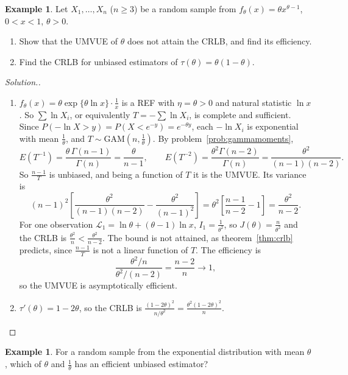 \documentclass[12pt,a4paper]{report}
\theoremstyle{definition}
\newtheorem{exa}[thm]{Example}
\newenvironment{solution}
  {\renewcommand{\qedsymbol}{}\begin{proof}[\textit{Solution}.]}
  {\end{proof}}
\begin{document}
\begin{exa}
\label{ex:powercrlb}
Let $X_1, \dots, X_n$ ($n\ge 3$) be a random sample from $f_\theta(x) = \theta x^{\theta - 1}$,
$0<x<1$, $\theta>0$.
\begin{enumerate}
\item[(a)] Show that the UMVUE of $\theta$ does not attain the CRLB, and find its
efficiency.
\item[(b)] Find the CRLB for unbiased estimators of $\tau(\theta) = \theta(1 - \theta)$.
\end{enumerate}
\end{exa}

\begin{solution}
\begin{enumerate}
\item[(a)] $f_\theta(x) = \theta\exp\{\theta\ln x\}\cdot\frac1x$ is a REF with
$\eta = \theta>0$ and natural statistic $\ln x$. So $\sum\ln X_i$, or equivalently
$T = -\sum\ln X_i$, is complete and sufficient. Since
$P(-\ln X>y) = P(X<e^{-y}) = e^{-\theta y}$, each $-\ln X_i$ is exponential with mean
$\frac1\theta$, and $T\sim\text{GAM}\left(n, \frac1\theta\right)$. By
problem~\ref{prob:gammamoments},
\[E(T^{-1}) = \frac{\theta\,\Gamma(n - 1)}{\Gamma(n)} = \frac{\theta}{n - 1},\qquad
E(T^{-2}) = \frac{\theta^2\Gamma(n - 2)}{\Gamma(n)} = \frac{\theta^2}{(n - 1)(n - 2)} .\]
So $\frac{n - 1}{T}$ is unbiased, and being a function of $T$ it is the UMVUE. Its
variance is
\[(n - 1)^2\left[\frac{\theta^2}{(n - 1)(n - 2)} - \frac{\theta^2}{(n - 1)^2}\right]
= \theta^2\left[\frac{n - 1}{n - 2} - 1\right] = \frac{\theta^2}{n - 2} .\]
For one observation $\mathcal{L}_1 = \ln\theta + (\theta - 1)\ln x$, $I_1 = \frac{1}{\theta^2}$,
so $J(\theta) = \frac{n}{\theta^2}$ and the CRLB is $\frac{\theta^2}{n}<\frac{\theta^2}{n - 2}$.
The bound is not attained, as theorem~\ref{thm:crlb} predicts, since $\frac{n - 1}{T}$
is not a linear function of $T$. The efficiency is
\[\frac{\theta^2/n}{\theta^2/(n - 2)} = \frac{n - 2}{n}\longrightarrow 1,\]
so the UMVUE is asymptotically efficient.
\item[(b)] $\tau'(\theta) = 1 - 2\theta$, so the CRLB is
$\frac{(1 - 2\theta)^2}{n/\theta^2} = \frac{\theta^2(1 - 2\theta)^2}{n}$.
\end{enumerate}
\end{solution}

\begin{exa}
\label{ex:exponentialcrlb}
For a random sample from the exponential distribution with mean $\theta$, which of
$\theta$ and $\frac1\theta$ has an efficient unbiased estimator?
\end{exa}
\end{document}
